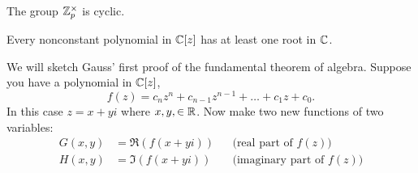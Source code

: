 \documentclass{ximera}
\begin{document}
\begin{corollary}\label{C:mzpc}
  The group $\mathbb Z_p^\times$ is cyclic.
\end{corollary}









\begin{theorem}\label{T:fta}
  Every nonconstant polynomial in $\mathbb C[z]$ has at least one root in
  $\mathbb C$.
  \begin{sketch}
    We will sketch Gauss' first proof of the fundamental theorem of
    algebra. Suppose you have a polynomial in $\mathbb C[z]$,
    \[
    f(z) = c_n z^n + c_{n-1}z^{n-1} + \dots + c_1 z + c_0.
    \]
    In this case $z = x + yi$ where $x,y,\in\mathbb R$. Now make two new
    functions of two variables:
    \begin{align*}
      G(x,y) &= \Re(f(x+ yi)) & & \text{(real part of $f(z)$)}\\
      H(x,y) &= \Im(f(x+yi)) & & \text{(imaginary part of $f(z)$)}
    \end{align*}


\end{sketch}
\end{theorem}
\end{document}
